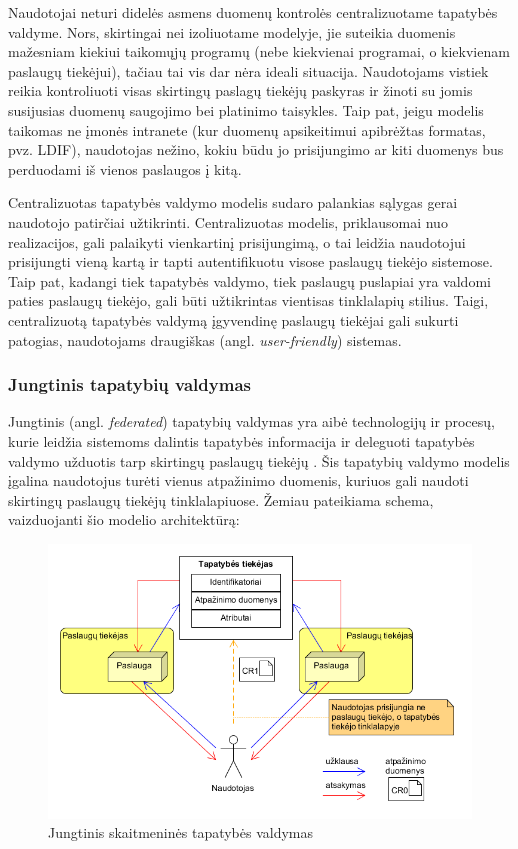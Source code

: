 Naudotojai neturi didelės asmens duomenų kontrolės centralizuotame tapatybės valdyme. Nors, skirtingai nei izoliuotame modelyje, jie suteikia duomenis mažesniam kiekiui taikomųjų programų
(nebe kiekvienai programai, o kiekvienam paslaugų tiekėjui), tačiau tai vis dar nėra ideali situacija. Naudotojams vistiek reikia kontroliuoti
visas skirtingų paslagų tiekėjų paskyras ir žinoti su jomis susijusias duomenų saugojimo bei platinimo taisykles. Taip pat, jeigu modelis taikomas ne įmonės intranete (kur
duomenų apsikeitimui apibrėžtas formatas, pvz. LDIF), naudotojas nežino, kokiu būdu jo prisijungimo ar kiti duomenys bus perduodami iš vienos paslaugos į kitą.

Centralizuotas tapatybės valdymo modelis sudaro palankias sąlygas gerai naudotojo patirčiai užtikrinti. Centralizuotas modelis, priklausomai nuo realizacijos,
gali palaikyti vienkartinį prisijungimą, o tai leidžia naudotojui prisijungti vieną kartą ir tapti autentifikuotu visose paslaugų tiekėjo sistemose. Taip pat, kadangi
tiek tapatybės valdymo, tiek paslaugų puslapiai yra valdomi paties paslaugų tiekėjo, gali būti užtikrintas vientisas tinklalapių stilius. Taigi, centralizuotą tapatybės valdymą
įgyvendinę paslaugų tiekėjai gali sukurti patogias, naudotojams draugiškas (angl. \textit{user-friendly}) sistemas.

\subsubsection{Jungtinis tapatybių valdymas}



Jungtinis (angl. \textit{federated}) tapatybių valdymas yra aibė technologijų
ir procesų, kurie leidžia sistemoms dalintis tapatybės informacija ir deleguoti tapatybės valdymo užduotis
tarp skirtingų paslaugų tiekėjų \cite{Maler2008}. Šis tapatybių valdymo modelis įgalina naudotojus turėti vienus atpažinimo duomenis,
kuriuos gali naudoti skirtingų paslaugų tiekėjų tinklalapiuose. Žemiau pateikiama schema, vaizduojanti
šio modelio architektūrą:

\begin{figure}[H]
    \centering
    \includegraphics[scale=0.7]{img/federatedModel}
    \caption{Jungtinis skaitmeninės tapatybės valdymas \cite{Cao2010}}
    \label{fig:federatedModel}
\end{figure}


